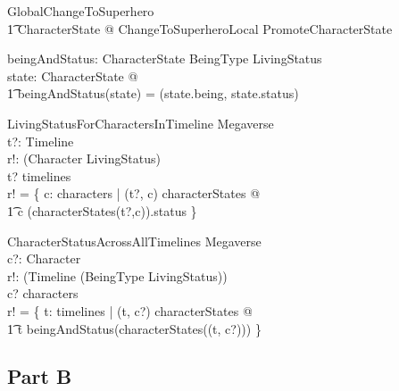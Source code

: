 \documentclass{article}
\begin{document}
\begin{zed}
GlobalChangeToSuperhero  \\
\t1 \exists \Delta CharacterState @ ChangeToSuperheroLocal \land PromoteCharacterState \\
\end{zed}

\begin{axdef}
beingAndStatus: CharacterState \fun BeingType \cross LivingStatus \\
\where
\forall state: CharacterState @ \\
\t1 beingAndStatus(state) = (state.being, state.status) \\
\end{axdef}

\begin{schema}{LivingStatusForCharactersInTimeline}
\Xi Megaverse \\
t?: Timeline \\ 
r!: \power (Character \cross LivingStatus) \\
\where 
t? \in timelines \\
r! = \{ c: characters | (t?, c) \in \dom characterStates @ \\
\t1 c \mapsto (characterStates(t?,c)).status
\} \\ 
\end{schema}

\begin{schema}{CharacterStatusAcrossAllTimelines}
\Xi Megaverse \\
c?: Character \\ 
r!: \power (Timeline \cross (BeingType \cross LivingStatus)) \\
\where 
c? \in characters \\
r! = \{ t: timelines | (t, c?) \in \dom characterStates @  \\
\t1 t \mapsto beingAndStatus(characterStates((t, c?)))   
\} \\ 
\end{schema}
\pagebreak

\subsection*{Part B}
\end{document}
